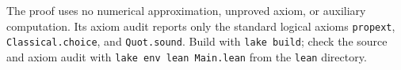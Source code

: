 \documentclass[11pt]{article}
\begin{document}
The proof uses no numerical approximation, unproved axiom, or auxiliary
computation. Its axiom audit reports only the standard logical axioms
\texttt{propext}, \texttt{Classical.choice}, and \texttt{Quot.sound}.
Build with \texttt{lake build}; check the source and axiom audit with
\texttt{lake env lean Main.lean} from the \texttt{lean} directory.
\end{document}
